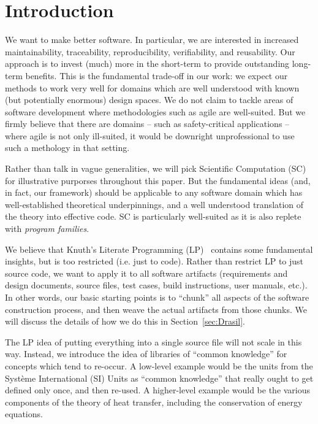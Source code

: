 \documentclass[preprint, 10pt]{sigplanconf}
\begin{document}
\section{Introduction}
\label{sec:Intro}

We want to make better software.  In particular, we are interested in
increased maintainability, traceability, reproducibility, verifiability, and
reusability.  Our approach is to invest (much) more in the short-term to provide
outstanding long-term benefits. This is the fundamental trade-off in
our work: we expect our methods to work very well for domains which are 
well understood with known (but potentially enormous) design spaces.  We do
not claim to tackle areas of software development where methodologies such
as agile are well-suited.  But we firmly believe that there are domains --
such as safety-critical applications -- where agile is not only ill-suited,
it would be downright unprofessional to use such a methology in that setting.

Rather than talk in vague generalities, we will pick Scientific Computation
(SC) for illustrative purporses throughout this paper.  But the fundamental
ideas (and, in fact, our framework) should be applicable to any software
domain which has well-established theoretical underpinnings, and a well
understood translation of the theory into effective code.  SC is particularly
well-suited as it is also replete with \emph{program families}.

We believe that Knuth's Literate Programming (LP)~\cite{Knuth1984} contains
some fundamental insights, but is too restricted (i.e. just to code).  Rather
than restrict LP to just source code, we want to apply it to all software
artifacts (requirements and design documents, source files, test cases, build
instructions, user manuals, etc.).  In other words, our basic starting points is
to ``chunk'' all aspects of the software construction process, and then weave the
actual artifacts from those chunks.  We will discuss the details of how we do this
in Section~\ref{sec:Drasil}.

The LP idea of putting everything into a single source file will not scale
in this way.  Instead, we introduce the idea of libraries of ``common knowledge''
for concepts which tend to re-occur.  A low-level example would be the units
from the Syst\`{e}me International (SI) Units as ``common knowledge'' that really
ought to get defined only once, and then re-used.  A higher-level example would be
the various components of the theory of heat transfer, including the conservation
of energy equations.
\end{document}
